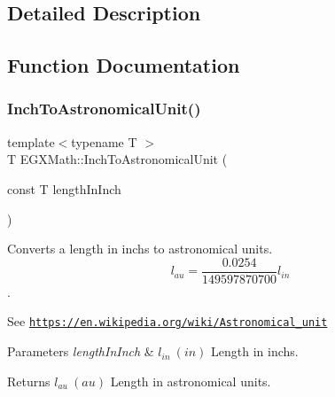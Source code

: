 \subsection{Detailed Description}


\subsection{Function Documentation}
\mbox{\label{group___e_g_x_math-_conversions-_length_conversions-_imperial-_inch-_astronomical_ga3d2920dc1a8ee693fd011be23d37c5ca}} 
\subsubsection{\texorpdfstring{Inch\+To\+Astronomical\+Unit()}{InchToAstronomicalUnit()}}
{\footnotesize\ttfamily template$<$typename T $>$ \\
T E\+G\+X\+Math\+::\+Inch\+To\+Astronomical\+Unit (\begin{DoxyParamCaption}\item[{const T}]{length\+In\+Inch }\end{DoxyParamCaption})}



Converts a length in inchs to astronomical units. \[ l_{au}=\frac{0.0254}{149597870700} l_{in} \]. 

See \href{https://en.wikipedia.org/wiki/Astronomical_unit}{\tt https\+://en.\+wikipedia.\+org/wiki/\+Astronomical\+\_\+unit} 
\begin{DoxyParams}{Parameters}
{\em length\+In\+Inch} & $ l_{in}\ (in)$ Length in inchs. \\
\hline
\end{DoxyParams}
\begin{DoxyReturn}{Returns}
$ l_{au}\ (au)$ Length in astronomical units. 
\end{DoxyReturn}
\mbox{\label{group___e_g_x_math-_conversions-_length_conversions-_imperial-_inch-_astronomical_ga3dc74f0303c8db4674f23ba6a99d150b}} 
